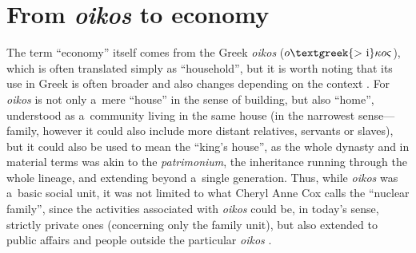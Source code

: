 \section{From \textit{oikos} to economy}

The term ``economy'' itself comes from the Greek \textit{oikos} ($o\text{\textgreek{>~i}}\kappa o\varsigma $), which is often translated simply as ``household'', but it is worth noting that its use in Greek is often broader and also changes depending on the context 
\parencite[][p.2]{roy_polis_1999}. %
 For \textit{oikos} is not only a~mere ``house'' in the sense of building, but also ``home'', understood as a~community living in the same house (in the narrowest sense---family, however it could also include more distant relatives, servants or slaves), but it could also be used to mean the ``king's house'', as the whole dynasty 
\parencite[][]{} %
 and in material terms was akin to the \textit{patrimonium}, the inheritance running through the whole lineage, and extending beyond a~single generation. Thus, while \textit{oikos} was a~basic social unit, it was not limited to what Cheryl Anne Cox 
\parencite*[][]{cox_household_1998} %
 calls the ``nuclear family'', since the activities associated with \textit{oikos} could be, in today's sense, strictly private ones (concerning only the family unit), but also extended to public affairs and people outside the particular \textit{oikos} 
\parencite[][]{martin_urban_2016}.%





